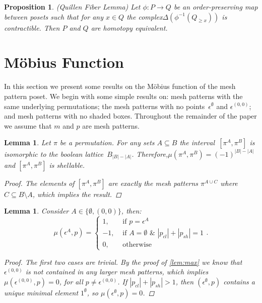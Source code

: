 \documentclass[preprint,11pt]{elsarticle}
\newtheorem{lem}[thm]{Lemma}\crefname{lem}{Lemma}{Lemmas}
\newtheorem{prop}[thm]{Proposition}\crefname{prop}{Proposition}{Propositions}
\newcommand\cl[1]{#1_{cl}}
\newcommand\sh[1]{#1_{sh}}
\numberwithin{equation}{section}
\numberwithin{figure}{section}
\numberwithin{thm}{section}
\begin{document}
\begin{prop}\label{thm:Quil}(Quillen Fiber Lemma)
Let $\phi:P\rightarrow Q$ be an order-preserving map between posets such that for any
$x\in Q$ the complex\linebreak $\Delta(\phi^{-1}(Q_{\ge x}))$ is contractible.
Then $P$ and $Q$ are homotopy equivalent.
\end{prop}

\section{M\"obius Function}\label{sec:MF}
In this section we present some results on the M\"obius function of the mesh pattern poset.
We begin with some simple results on: mesh patterns with the same underlying permutations;
the mesh patterns with no points~$\epsilon^\emptyset$ and $\epsilon^{(0,0)}$;
and mesh patterns with no shaded boxes.
Throughout the remainder of the paper we assume that $m$ and $p$ are
mesh patterns.

\begin{lem}
Let $\pi$ be a permutation. For any sets $A\subseteq B$ the interval~$[\pi^A,\pi^B]$ is isomorphic to the boolean
 lattice~$B_{|B|-|A|}$. Therefore,\linebreak ${\mu(\pi^A,\pi^B)=(-1)^{|B|-|A|}}$ and
$[\pi^A,\pi^B]$ is shellable.
\begin{proof}
The elements of $[\pi^A,\pi^B]$ are exactly the mesh patterns $\pi^{A\cup C}$
where $C\subseteq B\setminus A$, which implies the result.
\end{proof}
\end{lem}

\begin{lem}
Consider $A\in\{\emptyset,(0,0)\}$, then:
$$\mu(\epsilon^{A},p)=\begin{cases}
1,&\mbox{ if }p=\epsilon^A \\
-1,&\mbox{ if }A=\emptyset\,\,\&\,\,|\cl{p}|+|\sh{p}|=1\\
0,&\mbox{ otherwise}
\end{cases}.$$
\begin{proof}
The first two cases are trivial. By the proof of \cref{lem:max} we know that
$\epsilon^{(0,0)}$ is not contained in any larger mesh patterns, which implies
$\mu(\epsilon^{(0,0)},p)=0$, for all $p\not=\epsilon^{(0,0)}$. If $|\cl{p}|+|\sh{p}|>1$, then
$(\epsilon^\emptyset,p)$ contains a unique minimal element $1^\emptyset$, so
$\mu(\epsilon^\emptyset,p)=0$.
\end{proof}
\end{lem}
\end{document}
